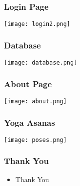\documentclass[12pt]{beamer}
\begin{document}
\begin{frame}  
  \frametitle{Login Page}      
      \begin {center}
         \texttt{[image: login2.png]} 
      \end{center}   
\end{frame}  
   
\begin{frame}  
  \frametitle{Database}      
      \begin {center}
         \texttt{[image: database.png]} 
      \end{center}   
\end{frame}     

\begin{frame}  
  \frametitle{About Page}      
      \begin {center}
         \texttt{[image: about.png]} 
      \end{center}   
\end{frame}  

\begin{frame}  
  \frametitle{Yoga Asanas}      
      \begin {center}
         \texttt{[image: poses.png]} 
      \end{center}   
\end{frame}  

\begin{frame}
    \frametitle{Thank You}
    \begin{itemize}          
        \item {Thank You}                    
    \end{itemize}       
\end{frame}
\end{document}
